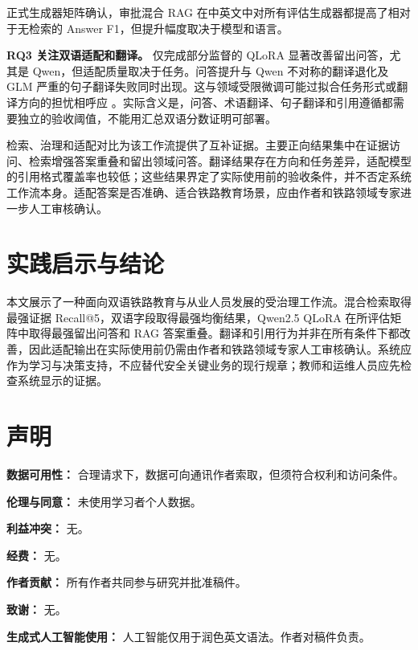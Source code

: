 正式生成器矩阵确认，审批混合 RAG 在中英文中对所有评估生成器都提高了相对于无检索的 Answer F1，但提升幅度取决于模型和语言。

\textbf{RQ3 关注双语适配和翻译。} 仅完成部分监督的 QLoRA 显著改善留出问答，尤其是 Qwen，但适配质量取决于任务。问答提升与 Qwen 不对称的翻译退化及 GLM 严重的句子翻译失败同时出现。这与领域受限微调可能过拟合任务形式或翻译方向的担忧相呼应 \citep{hu2024translation,vieira2024translation}。实际含义是，问答、术语翻译、句子翻译和引用遵循都需要独立的验收阈值，不能用汇总双语分数证明可部署。

检索、治理和适配对比为该工作流提供了互补证据。主要正向结果集中在证据访问、检索增强答案重叠和留出领域问答。翻译结果存在方向和任务差异，适配模型的引用格式覆盖率也较低；这些结果界定了实际使用前的验收条件，并不否定系统工作流本身。适配答案是否准确、适合铁路教育场景，应由作者和铁路领域专家进一步人工审核确认。

\section{实践启示与结论}

本文展示了一种面向双语铁路教育与从业人员发展的受治理工作流。混合检索取得最强证据 Recall@5，双语字段取得最强均衡结果，Qwen2.5 QLoRA 在所评估矩阵中取得最强留出问答和 RAG 答案重叠。翻译和引用行为并非在所有条件下都改善，因此适配输出在实际使用前仍需由作者和铁路领域专家人工审核确认。系统应作为学习与决策支持，不应替代安全关键业务的现行规章；教师和运维人员应先检查系统显示的证据。

\section{声明}

\textbf{数据可用性：} 合理请求下，数据可向通讯作者索取，但须符合权利和访问条件。

\textbf{伦理与同意：} 未使用学习者个人数据。

\textbf{利益冲突：} 无。

\textbf{经费：} 无。

\textbf{作者贡献：} 所有作者共同参与研究并批准稿件。

\textbf{致谢：} 无。

\textbf{生成式人工智能使用：} 人工智能仅用于润色英文语法。作者对稿件负责。

